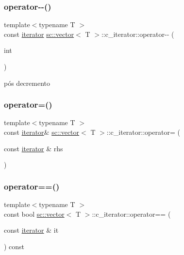 \subsubsection{\texorpdfstring{operator-\/-\/()}{operator--()}\hspace{0.1cm}{\footnotesize\ttfamily [2/2]}}
{\footnotesize\ttfamily template$<$typename T $>$ \\
const \hyperlink{classsc_1_1vector_1_1iterator}{iterator} \hyperlink{classsc_1_1vector}{sc\+::vector}$<$ T $>$\+::c\+\_\+iterator\+::operator-\/-\/ (\begin{DoxyParamCaption}\item[{int}]{ }\end{DoxyParamCaption})\hspace{0.3cm}{\ttfamily [inline]}}



pós decremento 

\mbox{\label{classsc_1_1vector_1_1c__iterator_a7541fc3d6c1e4bd7552cfc3c0b0e30f6}} 
\subsubsection{\texorpdfstring{operator=()}{operator=()}}
{\footnotesize\ttfamily template$<$typename T $>$ \\
const \hyperlink{classsc_1_1vector_1_1iterator}{iterator}\& \hyperlink{classsc_1_1vector}{sc\+::vector}$<$ T $>$\+::c\+\_\+iterator\+::operator= (\begin{DoxyParamCaption}\item[{const \hyperlink{classsc_1_1vector_1_1iterator}{iterator} \&}]{rhs }\end{DoxyParamCaption})\hspace{0.3cm}{\ttfamily [inline]}}

\mbox{\label{classsc_1_1vector_1_1c__iterator_aba78ee811bac2184736548d98358a50e}} 
\subsubsection{\texorpdfstring{operator==()}{operator==()}}
{\footnotesize\ttfamily template$<$typename T $>$ \\
const bool \hyperlink{classsc_1_1vector}{sc\+::vector}$<$ T $>$\+::c\+\_\+iterator\+::operator== (\begin{DoxyParamCaption}\item[{const \hyperlink{classsc_1_1vector_1_1iterator}{iterator} \&}]{it }\end{DoxyParamCaption}) const\hspace{0.3cm}{\ttfamily [inline]}}



